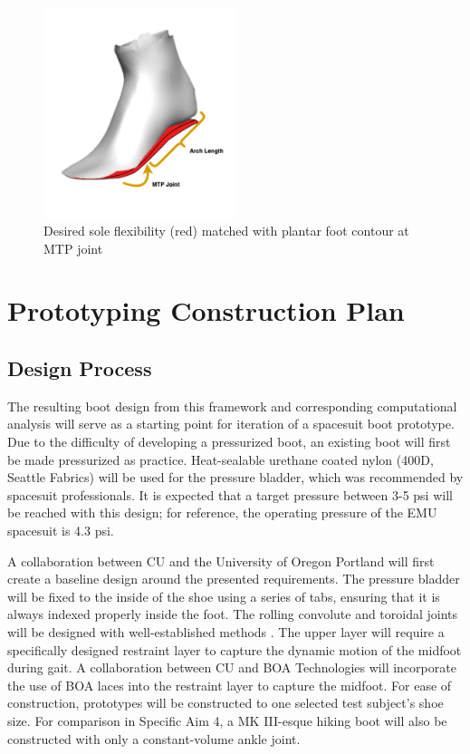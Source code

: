 \documentclass[defaultstyle,11pt]{comps}
\begin{document}
\begin{figure}
\hypertarget{fig:SA3-SoleFlex}{%
\centering
\includegraphics[width=0.5\textwidth,height=\textheight]{../fig/SA3/SoleFlex.png}
\caption{Desired sole flexibility (red) matched with plantar foot contour at MTP joint}\label{fig:SA3-SoleFlex}
}
\end{figure}

\hypertarget{prototyping-construction-plan}{%
\section{Prototyping Construction Plan}\label{prototyping-construction-plan}}

\hypertarget{design-process}{%
\subsection{Design Process}\label{design-process}}

The resulting boot design from this framework and corresponding computational analysis will serve as a starting point for iteration of a spacesuit boot prototype.
Due to the difficulty of developing a pressurized boot, an existing boot will first be made pressurized as practice.
Heat-sealable urethane coated nylon (400D, Seattle Fabrics) will be used for the pressure bladder, which was recommended by spacesuit professionals.
It is expected that a target pressure between 3-5 psi will be reached with this design; for reference, the operating pressure of the EMU spacesuit is 4.3 psi.

A collaboration between CU and the University of Oregon Portland will first create a baseline design around the presented requirements.
The pressure bladder will be fixed to the inside of the shoe using a series of tabs, ensuring that it is always indexed properly inside the foot.
The rolling convolute and toroidal joints will be designed with well-established methods \citep{Harris2001}.
The upper layer will require a specifically designed restraint layer to capture the dynamic motion of the midfoot during gait.
A collaboration between CU and BOA Technologies will incorporate the use of BOA laces into the restraint layer to capture the midfoot.
For ease of construction, prototypes will be constructed to one selected test subject's shoe size.
For comparison in Specific Aim 4, a MK III-esque hiking boot will also be constructed with only a constant-volume ankle joint.
\end{document}
